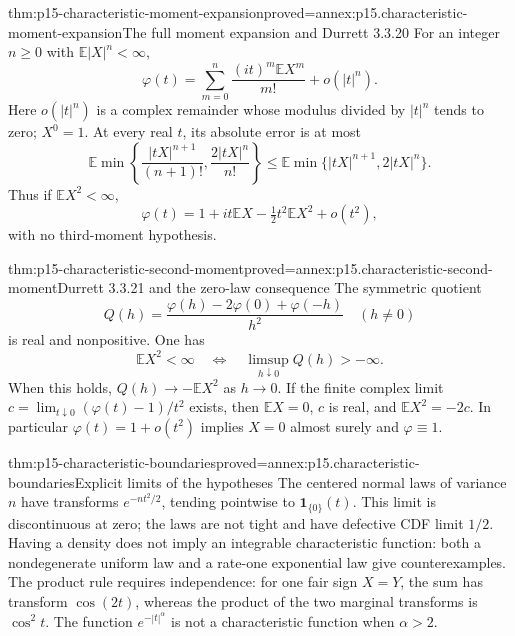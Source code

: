 \begin{hbtheorem}{thm:p15-characteristic-moment-expansion}{proved=annex:p15.characteristic-moment-expansion}{The full moment expansion and Durrett 3.3.20}
For an integer \(n\geq0\) with \(\mathbb E|X|^n<\infty\),
\[
 \varphi(t)=\sum_{m=0}^n\frac{(it)^m\mathbb EX^m}{m!}
                                      +o(|t|^n).
\]
Here \(o(|t|^n)\) is a complex remainder whose modulus divided
by \(|t|^n\) tends to zero; \(X^0=1\).
At every real \(t\), its absolute error is at most
\[
 \mathbb E\min\left\{\frac{|tX|^{n+1}}{(n+1)!},
                              \frac{2|tX|^n}{n!}\right\}
 \leq\mathbb E\min\{|tX|^{n+1},2|tX|^n\}.
\]
Thus if \(\mathbb EX^2<\infty\),
\[
 \varphi(t)=1+it\mathbb EX-\tfrac12t^2\mathbb EX^2+o(t^2),
\]
with no third-moment hypothesis.
\end{hbtheorem}

\begin{hbtheorem}{thm:p15-characteristic-second-moment}{proved=annex:p15.characteristic-second-moment}{Durrett 3.3.21 and the zero-law consequence}
The symmetric quotient
\[
 Q(h)=\frac{\varphi(h)-2\varphi(0)+\varphi(-h)}{h^2}
                    \quad(h\ne0)
\]
is real and nonpositive. One has
\[
 \mathbb EX^2<\infty
 \quad\Longleftrightarrow\quad
 \limsup_{h\downarrow0}Q(h)>-\infty.
\]
When this holds, \(Q(h)\to-\mathbb EX^2\) as \(h\to0\).
If the finite complex limit
\(c=\lim_{t\downarrow0}(\varphi(t)-1)/t^2\) exists, then
\(\mathbb EX=0\), \(c\) is real, and \(\mathbb EX^2=-2c\).
In particular \(\varphi(t)=1+o(t^2)\) implies \(X=0\)
almost surely and \(\varphi\equiv1\).
\end{hbtheorem}

\begin{hbtheorem}{thm:p15-characteristic-boundaries}{proved=annex:p15.characteristic-boundaries}{Explicit limits of the hypotheses}
The centered normal laws of variance \(n\) have transforms
\(e^{-nt^2/2}\), tending pointwise to \(\mathbf1_{\{0\}}(t)\).
This limit is discontinuous at zero; the laws are not tight
and have defective CDF limit \(1/2\).
Having a density does not imply an integrable characteristic
function: both a nondegenerate uniform law and a rate-one
exponential law give counterexamples.
The product rule requires independence: for one fair sign
\(X=Y\), the sum has transform \(\cos(2t)\), whereas the
product of the two marginal transforms is \(\cos^2t\).
The function \(e^{-|t|^\alpha}\) is not a characteristic
function when \(\alpha>2\).
\end{hbtheorem}

